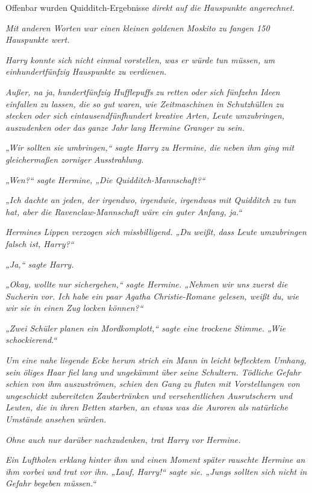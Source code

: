 {Offenbar wurden Quidditch-Ergebnisse \emph{direkt auf die Hauspunkte angerechnet.}

\emph{Mit anderen Worten war einen kleinen goldenen Moskito zu fangen 150 Hauspunkte wert.}

\emph{Harry konnte sich nicht einmal} \emph{\emph{vorstellen,}} \emph{was er würde tun müssen, um einhundertfünfzig Hauspunkte zu verdienen.}

\emph{Außer, na ja,} \emph{\emph{hundertfünfzig Hufflepuffs}} \emph{zu retten oder} \emph{sich} \emph{\emph{fünfzehn Ideen einfallen zu lassen, die so gut waren, wie Zeitmaschinen in Schutzhüllen zu stecken}} \emph{oder sich} \emph{\emph{eintausendfünfhundert kreative Arten, Leute umzubringen}, auszudenken oder das} \emph{\emph{ganze Jahr lang}} \emph{Hermine Granger zu sein.}

\emph{„Wir sollten sie umbringen,“ sagte Harry zu Hermine, die neben ihm ging mit gleichermaßen zorniger Ausstrahlung.}

\emph{„Wen?“ sagte Hermine, „Die Quidditch-Mannschaft?“}

\emph{„Ich dachte an jeden, der irgendwo,} \emph{irgendwie,} \emph{irgendwas mit Quidditch zu tun hat, aber die Ravenclaw-Mannschaft wäre ein guter Anfang, ja.“}

\emph{Hermines Lippen verzogen sich missbilligend. „Du} \emph{\emph{weißt,}} \emph{dass Leute umzubringen falsch ist, Harry?“}

\emph{„Ja,“ sagte Harry.}

\emph{„Okay, wollte nur sichergehen,“ sagte Hermine. „Nehmen wir uns zuerst die Sucherin vor. Ich habe ein paar Agatha Christie-Romane gelesen, weißt du, wie wir sie in einen Zug locken können?“}

\emph{„Zwei Schüler} \emph{planen ein Mordkomplott,“ sagte eine trockene Stimme. „Wie schockierend.“}

\emph{Um eine nahe} \emph{liegende} \emph{Ecke herum strich ein Mann in leicht beflecktem Umhang, sein öliges Haar fiel lang und ungekämmt über seine Schultern. Tödliche Gefahr schien von ihm auszuströmen, schien den Gang zu fluten mit Vorstellungen von ungeschickt zubereiteten Zaubertränken und versehentlichen Ausrutschern und Leuten, die in ihren Betten starben, an etwas was die Auroren als natürliche Umstände ansehen würden.}

\emph{Ohne auch nur darüber nachzudenken, trat Harry vor Hermine.}

\emph{Ein Luftholen erklang hinter ihm und einen Moment später rauschte Hermine an ihm vorbei und trat vor} \emph{\emph{ihn.}} \emph{„Lauf, Harry!“ sagte sie. „Jungs sollten sich nicht in Gefahr begeben müssen.“}

}
